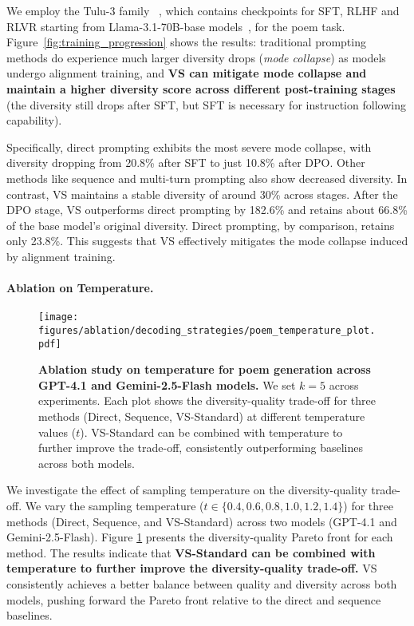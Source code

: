 We employ the Tulu-3 family~\citep{lambert2025tulu3pushingfrontiers} , which contains checkpoints for SFT, RLHF and RLVR starting from Llama-3.1-70B-base models~\citep{grattafiori2024llama3herdmodels}, for the poem task. Figure~\ref{fig:training_progression} shows the results:  traditional prompting methods do experience much larger diversity drops (\textit{mode collapse}) as models undergo alignment training, and \textbf{VS can mitigate mode collapse and maintain a higher diversity score across different post-training stages} (the diversity still drops after SFT, but SFT is necessary for instruction following capability). {Specifically, direct prompting exhibits the most severe mode collapse, with diversity dropping from 20.8\% after SFT to just 10.8\% after DPO. Other methods like sequence and multi-turn prompting also show decreased diversity. In contrast, VS maintains a stable diversity of around 30\% across stages. After the DPO stage, VS outperforms direct prompting by 182.6\% and retains about 66.8\% of the base model's original diversity. Direct prompting, by comparison, retains only 23.8\%. This suggests that VS effectively mitigates the mode collapse induced by alignment training.
\paragraph{Ablation on Temperature.} 
\begin{figure}[t]
    \centering
    \texttt{[image: figures/ablation/decoding\_strategies/poem\_temperature\_plot.pdf]}
    \caption{\textbf{Ablation study on temperature for poem generation across GPT-4.1 and Gemini-2.5-Flash models.} We set $k=5$ across experiments. Each plot shows the diversity-quality trade-off for three methods (Direct, Sequence, VS-Standard) at different temperature values ($t$). %
    VS-Standard can be combined with temperature to further improve the trade-off,  consistently outperforming baselines across both models.
    \vspace{-1em}
    }
    \label{fig:temperature_ablation}
\end{figure}

We investigate the effect of sampling temperature on the diversity-quality trade-off. We vary the sampling temperature ($t \in \{0.4, 0.6, 0.8, 1.0, 1.2, 1.4\}$) for three methods (Direct, Sequence, and VS-Standard) across two models (GPT-4.1 and Gemini-2.5-Flash). Figure \ref{fig:temperature_ablation} presents the diversity-quality Pareto front for each method. The results indicate that \textbf{VS-Standard can be combined with temperature to further improve the diversity-quality trade-off.} VS consistently achieves a better balance between quality and diversity across both models, pushing forward the Pareto front relative to the direct and sequence baselines. %


}

